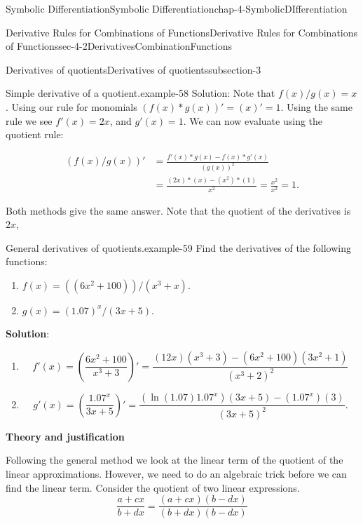\documentclass[oneside,10pt,]{book}
\newcommand{\terminology}[1]{\textbf{#1}}
\numberwithin{equation}{section}
\newcommand{\amp}{&}
\begin{document}
\begin{chapterptx}{Symbolic Differentiation}{}{Symbolic Differentiation}{}{}{chap-4-SymbolicDIfferentiation}
\begin{sectionptx}{Derivative Rules for Combinations of Functions}{}{Derivative Rules for Combinations of Functions}{}{}{sec-4-2DerivativesCombinationFunctions}
\begin{subsectionptx}{Derivatives of quotients}{}{Derivatives of quotients}{}{}{subsection-3}
\begin{example}{Simple derivative of a quotient.}{example-58}
Solution:	Note that \(f(x)/g(x)=x\).  Using our rule for monomials \((f(x)*g(x))'=(x )'=1\).  Using the same rule we see \(f'(x)=2x\), and \(g'(x)=1\).  We can now evaluate using the quotient rule:%
\par
\hypertarget{p-1559}{}%
%
\begin{equation*}
\begin{aligned} (f(x)/g(x))' \amp = \frac{f'(x)*g(x)-f(x)*g'(x)}{(g(x))^2} \\ 
\amp = \frac{(2x)*(x )-(x^2)*(1)}{x^2}=\frac{x^2}{x^2}=1. \end{aligned}
\end{equation*}
%
\end{example}
\hypertarget{p-1560}{}%
Both methods give the same answer.  Note that the quotient of the derivatives is \(2x\),%
\begin{example}{General derivatives of quotients.}{example-59}%
\hypertarget{p-1561}{}%
Find the derivatives of the following functions:%
\leavevmode%
\begin{enumerate}[label=(\alph*)]
\item\hypertarget{li-493}{}\(f(x)=((6x^2+100))/(x^3+x).\)%
\item\hypertarget{li-494}{}\(g(x)=(1.07)^x/(3x+5).\)%
\end{enumerate}
\hypertarget{p-1562}{}%
\terminology{Solution}:%
\leavevmode%
\begin{enumerate}[label=(\alph*)]
\item\hypertarget{li-495}{}%
\begin{equation*}
f'(x)=\left(\frac{6x^2+100}{x^3+3}\right)'
=\frac{(12x)(x^3+3)-(6x^2+100)(3x^2+1)}{(x^3+2)^2}
\end{equation*}
%
\item\hypertarget{li-496}{}%
\begin{equation*}
g'(x)=\left(\frac{1.07^x}{3x+5}\right)'
=\frac{(\ln(1.07)1.07^x)(3x+5)-(1.07^x)(3)}
{(3x+5)^2}.
\end{equation*}
%
\end{enumerate}
\end{example}
\hypertarget{p-1563}{}%
\terminology{Theory and justification}%
\par
\hypertarget{p-1564}{}%
Following the general method we look at the linear term of the quotient of the linear approximations.  However, we need to do an algebraic trick before we can find the linear term.  Consider the quotient of two linear expressions.%
%
\begin{equation*}
\frac{a+c x}{b+d x}=\frac{(a+c x)(b-d x)}{(b+d x)(b-d x)}

\end{equation*}
\end{subsectionptx}
\end{sectionptx}
\end{chapterptx}
\end{document}

